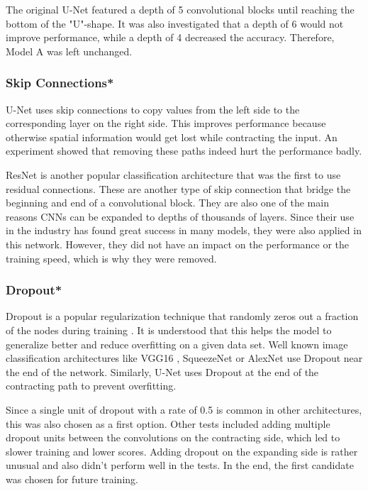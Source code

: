 The original U-Net featured a depth of 5 convolutional blocks until reaching the bottom of the "U"-shape. It was also investigated that a depth of 6 would not improve performance, while a depth of 4 decreased the accuracy. Therefore, Model A was left unchanged.

\subsubsection{Skip Connections*}

U-Net uses skip connections to copy values from the left side to the corresponding layer on the right side. This improves performance because otherwise spatial information would get lost while contracting the input. An experiment showed that removing these paths indeed hurt the performance badly.

ResNet \cite{He2015b} is another popular classification architecture that was the first to use residual connections. These are another type of skip connection that bridge the beginning and end of a convolutional block. They are also one of the main reasons CNNs can be expanded to depths of thousands of layers. Since their use in the industry has found great success in many models, they were also applied in this network. However, they did not have an impact on the performance or the training speed, which is why they were removed.

\subsubsection{Dropout*}

Dropout is a popular regularization technique that randomly zeros out a fraction of the nodes during training \cite{Srivastava2014}. It is understood that this helps the model to generalize better and reduce overfitting on a given data set. Well known image classification architectures like VGG16 \cite{Simonyan2014a}, SqueezeNet \cite{Iandola2016a} or AlexNet \cite{Krizhevsky} use Dropout near the end of the network. Similarly, U-Net uses Dropout at the end of the contracting path to prevent overfitting.

Since a single unit of dropout with a rate of 0.5 is common in other architectures, this was also chosen as a first option. Other tests included adding multiple dropout units between the convolutions on the contracting side, which led to slower training and lower scores. Adding dropout on the expanding side is rather unusual and also didn't perform well in the tests. In the end, the first candidate was chosen for future training.

